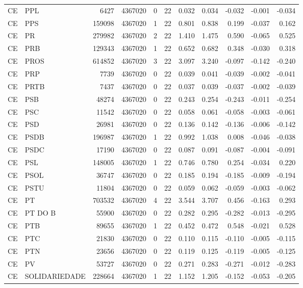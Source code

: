 \begin{landscape}
\begin{longtable}{llrrrrrrrrr}
CE & PPL & 6427 & 4367020 & 0 & 22 & 0.032 & 0.034 & -0.032 & -0.001 & -0.034 \\
CE & PPS & 159098 & 4367020 & 1 & 22 & 0.801 & 0.838 & 0.199 & -0.037 & 0.162 \\
CE & PR & 279982 & 4367020 & 2 & 22 & 1.410 & 1.475 & 0.590 & -0.065 & 0.525 \\
CE & PRB & 129343 & 4367020 & 1 & 22 & 0.652 & 0.682 & 0.348 & -0.030 & 0.318 \\
CE & PROS & 614852 & 4367020 & 3 & 22 & 3.097 & 3.240 & -0.097 & -0.142 & -0.240 \\
CE & PRP & 7739 & 4367020 & 0 & 22 & 0.039 & 0.041 & -0.039 & -0.002 & -0.041 \\
CE & PRTB & 7437 & 4367020 & 0 & 22 & 0.037 & 0.039 & -0.037 & -0.002 & -0.039 \\
CE & PSB & 48274 & 4367020 & 0 & 22 & 0.243 & 0.254 & -0.243 & -0.011 & -0.254 \\
CE & PSC & 11542 & 4367020 & 0 & 22 & 0.058 & 0.061 & -0.058 & -0.003 & -0.061 \\
CE & PSD & 26981 & 4367020 & 0 & 22 & 0.136 & 0.142 & -0.136 & -0.006 & -0.142 \\
CE & PSDB & 196987 & 4367020 & 1 & 22 & 0.992 & 1.038 & 0.008 & -0.046 & -0.038 \\
CE & PSDC & 17190 & 4367020 & 0 & 22 & 0.087 & 0.091 & -0.087 & -0.004 & -0.091 \\
CE & PSL & 148005 & 4367020 & 1 & 22 & 0.746 & 0.780 & 0.254 & -0.034 & 0.220 \\
CE & PSOL & 36747 & 4367020 & 0 & 22 & 0.185 & 0.194 & -0.185 & -0.009 & -0.194 \\
CE & PSTU & 11804 & 4367020 & 0 & 22 & 0.059 & 0.062 & -0.059 & -0.003 & -0.062 \\
CE & PT & 703532 & 4367020 & 4 & 22 & 3.544 & 3.707 & 0.456 & -0.163 & 0.293 \\
CE & PT DO B & 55900 & 4367020 & 0 & 22 & 0.282 & 0.295 & -0.282 & -0.013 & -0.295 \\
CE & PTB & 89655 & 4367020 & 1 & 22 & 0.452 & 0.472 & 0.548 & -0.021 & 0.528 \\
CE & PTC & 21830 & 4367020 & 0 & 22 & 0.110 & 0.115 & -0.110 & -0.005 & -0.115 \\
CE & PTN & 23656 & 4367020 & 0 & 22 & 0.119 & 0.125 & -0.119 & -0.005 & -0.125 \\
CE & PV & 53727 & 4367020 & 0 & 22 & 0.271 & 0.283 & -0.271 & -0.012 & -0.283 \\
CE & SOLIDARIEDADE & 228664 & 4367020 & 1 & 22 & 1.152 & 1.205 & -0.152 & -0.053 & -0.205 \\

\end{longtable}
\end{landscape}
